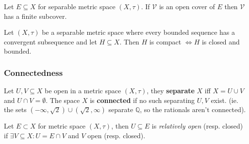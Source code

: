 \begin{multicols}{2}
\begin{theorem}[Lindel\"of]
Let $E\subseteq X$ for separable metric space $(X,\tau)$. If $\mathcal{V}$ is an open cover of $E$ then $\mathcal{V}$ has a finite subcover.
\end{theorem}

\begin{theorem}
Let $(X,\tau)$ be a separable metric space where every bounded sequence has a convergent subsequence and let $H\subseteq X$. Then $H$ is compact $\Leftrightarrow H$ is closed and bounded. 
\end{theorem}

\subsubsection*{Connectedness}
\begin{definition}[Connected]
Let $U,V\subseteq X$ be open in a metric space $(X,\tau)$, they \textbf{separate} $X$ iff $X=U\cup V$ and $U\cap V=\emptyset$. The space $X$ is \textbf{connected} if no such separating $U,V$ exist. (ie. the sets $(-\infty,\sqrt{2})\cup(\sqrt{2},\infty)$ separate $\mathbb{Q}$, so the rationals aren't connected).
\end{definition}

\begin{definition}
Let $E\subset X$ for metric space $(X,\tau)$, then $U\subseteq E$ is \textit{relatively open} (resp. closed) if $\exists V\subseteq X: U=E\cap V$ and $V$ open (resp. closed).
\end{definition}
\end{multicols}

